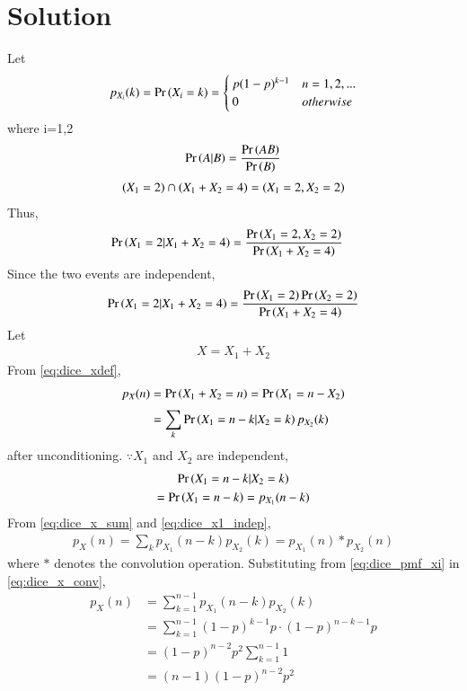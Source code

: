 \documentclass[journal,12pt,twocolumn]{IEEEtran}
\begin{document}
\section*{Solution}
Let 
\begin{align}
\label{eq:dice_pmf_xi}
p_{X_i}(k)=\Pr\left(X_i=k\right)=
\begin{cases}
p(1-p)^{k-1} & n=1,2,...
\\
0 & otherwise
\end{cases}
\end{align}
where i=1,2
\begin{align}
\Pr\left(A|B\right)=\frac{\Pr\left(AB\right)}{\Pr\left(B\right)}
\end{align}
\begin{align}
(X_1 = 2) \cap (X_1 + X_2 = 4)=\left(X_1=2,X_2=2\right)
\end{align}
Thus,
\begin{align}
  \Pr\left(X_1 = 2 | X_1 + X_2 = 4\right)&=\frac{\Pr\left(X_1=2,X_2=2\right)}{\Pr\left(X_1+X_2=4\right)}
 \end{align}
 Since the two events are independent,
\begin{align}\label{result}
  \Pr\left(X_1 = 2 | X_1 + X_2 = 4\right)=\frac{\Pr\left(X_1=2\right)\Pr\left(X_2=2\right)}{\Pr\left(X_1+X_2=4\right)}
 \end{align}
Let
\begin{align}\label{eq:dice_xdef}
X=X_1+X_2
\end{align}
From \eqref{eq:dice_xdef},
\begin{align}
p_X(n) &= \Pr\left(X_1 + X_2 = n\right) = \Pr\left(X_1  = n -X_2\right)
\\
&= \sum_{k}^{}\Pr\left(X_1  = n -k | X_2 = k\right)p_{X_2}(k)
\label{eq:dice_x_sum}
\end{align}
after unconditioning.  $\because X_1$ and $X_2$ are independent,
\begin{multline}
\Pr\left(X_1  = n -k | X_2 = k\right) 
\\
= \Pr\left(X_1  = n -k\right)
= p_{X_1}(n-k)
\label{eq:dice_x1_indep}
\end{multline}
From \eqref{eq:dice_x_sum} and \eqref{eq:dice_x1_indep},
\begin{align}
p_X(n) = \sum_{k}^{}p_{X_1}(n-k)p_{X_2}(k) = p_{X_1}(n)*p_{X_2}(n)
\label{eq:dice_x_conv}
\end{align}
where $*$ denotes the convolution operation. 
Substituting from \eqref{eq:dice_pmf_xi}
in \eqref{eq:dice_x_conv},
\begin{align}
p_X(n)& = \sum_{k=1}^{n-1}p_{X_1}(n-k)p_{X_2}(k)\\
& = \sum_{k=1}^{n-1} (1-p)^{k-1} p \cdot (1-p)^{n-k-1} p \\ & = (1-p)^{n-2} p^2 \sum_{k=1}^{n-1} 1 \\& = (n-1) (1-p)^{n-2}p^2\label{ref}\end{align}
\end{document}
